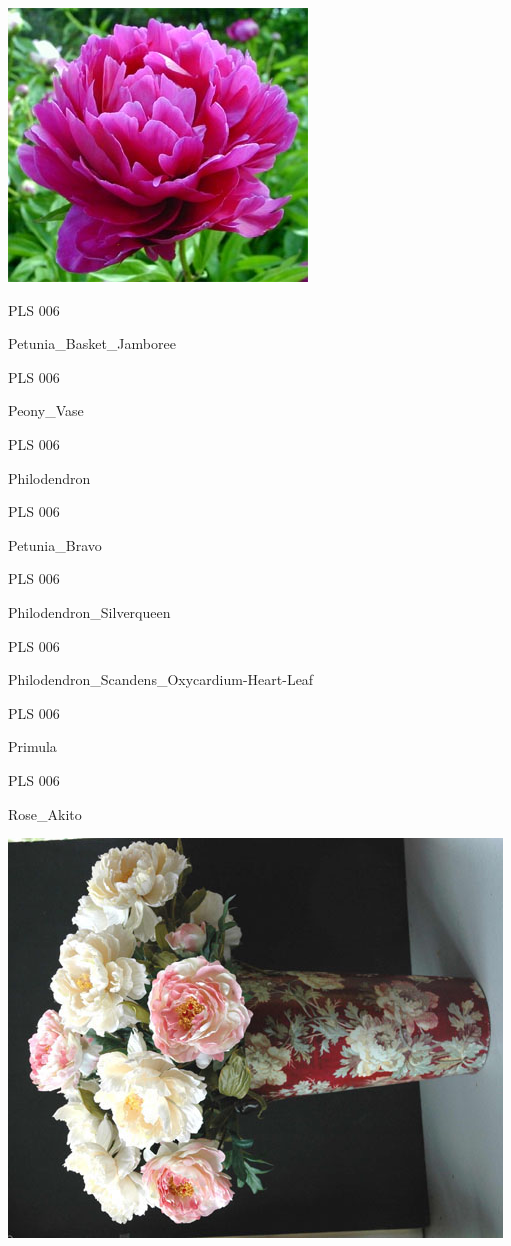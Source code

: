 \documentclass{article}
\begin{document}
\begin{center}
\includegraphics[height=0.925\paperheight]{../Peony_red.jpg}
\end{center}
\newpage

\noindent  PLS 006
\vfill
\centerline{{\huge Petunia\_Basket\_Jamboree }}
\vfill
\newpage

\noindent  PLS 006
\vfill
\centerline{{\huge Peony\_Vase }}
\vfill
\newpage

\noindent  PLS 006
\vfill
\centerline{{\huge Philodendron }}
\vfill
\newpage

\noindent  PLS 006
\vfill
\centerline{{\huge Petunia\_Bravo }}
\vfill
\newpage

\noindent  PLS 006
\vfill
\centerline{{\huge Philodendron\_Silverqueen }}
\vfill
\newpage

\noindent  PLS 006
\vfill
\centerline{{\huge Philodendron\_Scandens\_Oxycardium-Heart-Leaf }}
\vfill
\newpage

\noindent  PLS 006
\vfill
\centerline{{\huge Primula }}
\vfill
\newpage

\noindent  PLS 006
\vfill
\centerline{{\huge Rose\_Akito }}
\vfill
\newpage

\begin{center}
\includegraphics[height=0.925\paperheight]{../Peony_Vase.jpg}
\end{center}
\newpage
\end{document}
